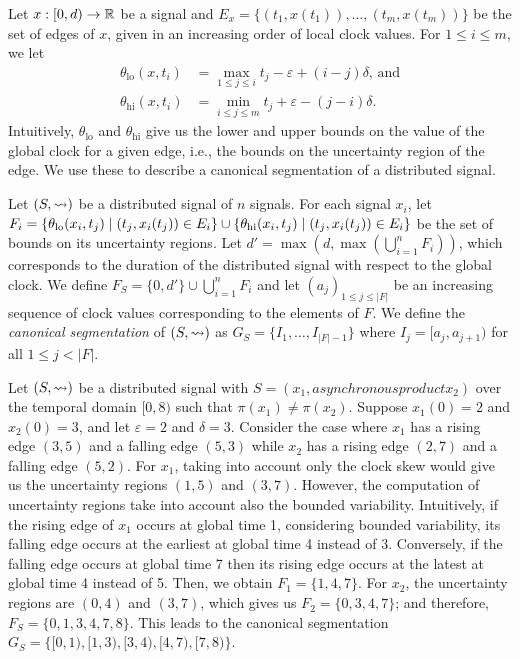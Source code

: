 Let $x : [0,d) \to \mathbb{R}$ be a signal and $E_x = \{(t_1, x(t_1)), \ldots, (t_m, x(t_m))\}$ be the set of edges of $x$, given in an increasing order of local clock values.
For $1 \leq i \leq m$, we let 
\begin{align*}
	\theta_{\text{lo}}(x,t_i) &= \max_{1 \leq j \leq i} t_j - \varepsilon + (i-j)\delta \text{, and} \\
	\theta_{\text{hi}}(x,t_i) &= \min_{i \leq j \leq m} t_j + \varepsilon - (j-i)\delta.
\end{align*}
Intuitively, $\theta_{\text{lo}}$ and $\theta_{\text{hi}}$ give us the lower and upper bounds on the value of the global clock for a given edge, i.e., the bounds on the uncertainty region of the edge.
We use these to describe a canonical segmentation of a distributed signal.

Let $(S,{\rightsquigarrow})$ be a distributed signal of $n$ signals.
For each signal $x_i$, let $F_i = \{\theta_{\text{lo}}(x_i, t_j) \st (t_j, x_i(t_j)) \in E_i\} \cup \{\theta_{\text{hi}}(x_i, t_j) \st (t_j, x_i(t_j)) \in E_i \}$ be the set of bounds on its uncertainty regions.
Let $d' = \max(d, \max (\bigcup_{i = 1}^{n} F_i))$, which corresponds to the duration of the distributed signal with respect to the global clock.
%
We define $F_S = \{0, d'\} \cup \bigcup_{i = 1}^{n} F_i$ and let $(a_j)_{1 \leq j \leq |F|}$ be an increasing sequence of clock values corresponding to the elements of $F$.
We define the \emph{canonical segmentation} of $(S,{\rightsquigarrow})$ as $G_S = \{I_1, \ldots, I_{|F| - 1}\}$ where $I_j = [a_j, a_{j+1})$ for all $1 \leq j < |F|$.

\begin{example} \label{ex:canonseg}
	Let $(S, {\rightsquigarrow})$ be a distributed signal with $S = (x_1,asynchronous product x_2)$ over the temporal domain $[0,8)$ such that $\pi(x_1) \neq \pi(x_2)$.
	Suppose $x_1(0) = 2$ and $x_2(0) = 3$, and let $\varepsilon = 2$ and $\delta = 3$.	
	Consider the case where $x_1$ has a rising edge $(3,5)$ and a falling edge $(5,3)$ while $x_2$ has a rising edge $(2,7)$ and a falling edge $(5,2)$.
	For $x_1$, taking into account only the clock skew would give us the uncertainty regions $(1,5)$ and $(3,7)$.
	However, the computation of uncertainty regions take into account also the bounded variability.
	Intuitively, if the rising edge of $x_1$ occurs at global time 1, considering bounded variability, its falling edge occurs at the earliest at global time 4 instead of 3.
	Conversely, if the falling edge occurs at global time 7 then its rising edge occurs at the latest at global time 4 instead of 5.
	Then, we obtain $F_1 = \{1, 4, 7\}$.
	For $x_2$, the uncertainty regions are $(0,4)$ and $(3,7)$, which gives us $F_2 = \{0, 3, 4, 7\}$; and therefore, $F_S = \{0, 1, 3, 4, 7, 8\}$.
	This leads to the canonical segmentation $G_S = \{[0,1), [1,3) ,[3,4) ,[4,7) ,[7,8)\}$.		
\end{example}

